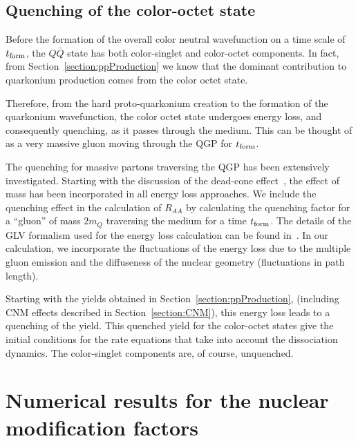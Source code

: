 \documentclass[article,showpacs,preprintnumbers,amsmath,amssymb]{revtex4}
\newcommand{\barQ}{{\bar{Q}}}
\begin{document}
\subsection{Quenching of the color-octet state~\label{section:quenched}}
Before the formation of the overall color neutral wavefunction on a time scale 
of $t_{\rm{form}}$, the $Q\barQ$ state has both color-singlet and color-octet
components. In fact, from Section~\ref{section:ppProduction} we know that the
dominant contribution to quarkonium production comes from the color octet
state. 

Therefore, from the hard proto-quarkonium creation to the formation of the
quarkonium wavefunction, the color octet state undergoes energy loss, and
consequently quenching, as it passes through the medium. This can be thought of
as a  very massive gluon moving through the QGP for $t_{\rm{form}}$.

The quenching for massive partons traversing the QGP has been extensively investigated.
Starting with the discussion of the dead-cone effect~\cite{Dokshitzer:2001}, the effect of mass
has been incorporated in all energy loss approaches. We include the quenching effect in the
calculation of $R_{AA}$ by calculating the quenching factor for a ``gluon'' of
mass $2m_Q$ traversing the medium for a time $t_{\rm{form}}$. The details
of the GLV formalism used for the energy loss calculation can be found
in~\cite{Djordjevic:2003zk}. In our calculation, we incorporate the fluctuations of the energy loss due to the
multiple gluon emission and the diffuseness of the nuclear geometry
(fluctuations in path length). 

Starting with the yields obtained in Section~\ref{section:ppProduction},
(including CNM effects described in Section~\ref{section:CNM}), this energy
loss leads to a quenching of the yield. This quenched yield for the color-octet
states give the initial conditions for the rate equations that take into
account the dissociation dynamics. The color-singlet components are, of course,
unquenched. 

\section{Numerical results for the nuclear modification factors~\label{section:Results}}
\end{document}
